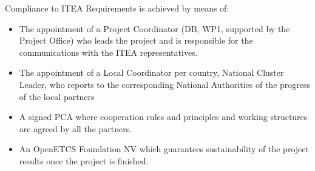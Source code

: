 \documentclass{template/openetcs_article}
\begin{document}
Compliance to ITEA Requirements is achieved by means of:
\begin{itemize}
\item The appointment of a Project Coordinator (DB, WP1, supported by the Project Office) who leads the project and is responsible for the communications with the ITEA representatives. 
\item The appointment of a Local Coordinator per country, National Cluster Leader, who reports to the corresponding National Authorities of the progress of the local partners
\item A signed PCA where cooperation rules and principles and working structures are agreed by all the partners.
\item An OpenETCS Foundation NV which guarantees sustainability of the project results once the project is finished.
\end{itemize}
\end{document}
